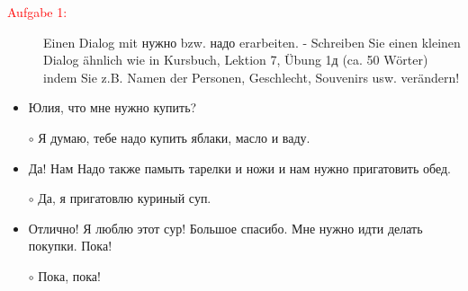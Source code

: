 \documentclass{article}
\theoremstyle{plain}
\begin{document}
\begin{description}
 	\item[\textcolor{red}{Aufgabe 1:}] Einen Dialog mit нужно bzw. надо erarbeiten. - Schreiben Sie einen kleinen Dialog \"ahnlich wie in Kursbuch, Lektion 7, \"Ubung 1д (ca. 50 W\"orter) indem Sie z.B. Namen der Personen, Geschlecht, Souvenirs usw. ver\"andern!  
\end{description}
\vspace*{1cm}

\begin{itemize}
	\item Юлия, что мне нужно купить?
	\item[$\circ$] Я думаю, тебе надо купить яблаки, масло и ваду.
	\item Да! Нам Надо также памыть тарелки и ножи и нам нужно пригатовить обед.
	\item[$\circ$] Да, я пригатовлю куриный суп.
	\item Отлично! Я люблю этот сур! Большое спасибо. Мне нужно идти делать покупки. Пока!
	\item[$\circ$] Пока, пока!
\end{itemize}
\end{document}
